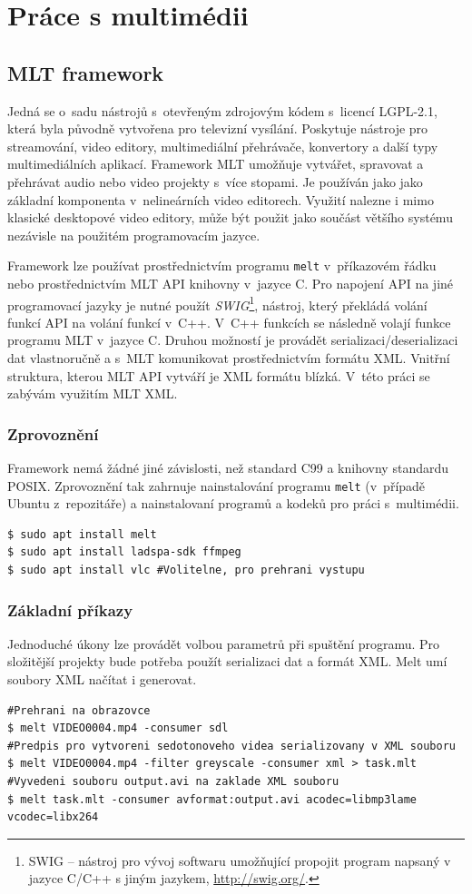 \chapter{Práce s multimédii}
\section{MLT framework}
Jedná se o~sadu nástrojů s~otevřeným zdrojovým kódem s~licencí LGPL-2.1, která byla původně vytvořena pro televizní vysílání. Poskytuje nástroje pro streamování, video editory, multimediální přehrávače, konvertory a další typy multimediálních aplikací. Framework MLT umožňuje vytvářet, spravovat a přehrávat audio nebo video projekty s~více stopami. Je používán jako jako základní komponenta v~nelineárních video editorech. Využití nalezne i mimo klasické desktopové video editory, může být použit jako součást většího systému nezávisle na použitém programovacím jazyce.

Framework lze používat prostřednictvím programu \texttt{melt} v~příkazovém řádku nebo prostřednictvím MLT API knihovny v~jazyce C. Pro napojení API na jiné programovací jazyky je nutné použít \textit{SWIG}\footnote{SWIG -- nástroj pro vývoj softwaru umožňující propojit program napsaný v jazyce C/C++ s jiným jazykem, \url{http://swig.org/}.}, nástroj, který překládá volání funkcí API na volání funkcí v~C++. V~C++ funkcích se následně volají funkce programu MLT v~jazyce C. Druhou možností je provádět serializaci/deserializaci dat vlastnoručně a s~MLT komunikovat prostřednictvím formátu XML. Vnitřní struktura, kterou MLT API vytváří je XML formátu blízká. V~této práci se zabývám využitím MLT XML.

\subsection{Zprovoznění}
Framework nemá žádné jiné závislosti, než standard C99 a knihovny standardu POSIX. Zprovoznění tak zahrnuje nainstalování programu \texttt{melt} (v~případě Ubuntu z~repozitáře) a nainstalovaní programů a kodeků pro práci s~multimédii.
\begin{lstlisting}[style=bash]
$ sudo apt install melt
$ sudo apt install ladspa-sdk ffmpeg
$ sudo apt install vlc #Volitelne, pro prehrani vystupu
\end{lstlisting}

\subsection{Základní příkazy}
Jednoduché úkony lze provádět volbou parametrů při spuštění programu. Pro složitější projekty bude potřeba použít serializaci dat a formát XML. Melt umí soubory XML načítat i generovat.
\begin{lstlisting}[style=bash]
#Prehrani na obrazovce
$ melt VIDEO0004.mp4 -consumer sdl
#Predpis pro vytvoreni sedotonoveho videa serializovany v XML souboru
$ melt VIDEO0004.mp4 -filter greyscale -consumer xml > task.mlt 
#Vyvedeni souboru output.avi na zaklade XML souboru
$ melt task.mlt -consumer avformat:output.avi acodec=libmp3lame vcodec=libx264
\end{lstlisting}
